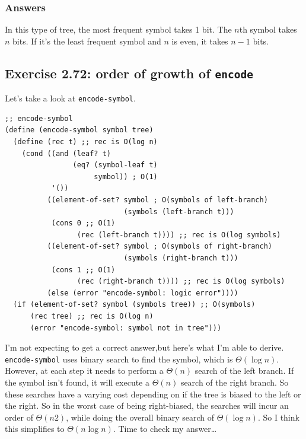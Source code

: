 \documentclass[final,fleqn,titlepage,twoside]{article}
\begin{document}
\subsubsection{Answers}
\label{sec:orgdb2de23}
In this type of tree, the most frequent symbol takes 1 bit. The \(n\)th symbol
takes \(n\) bits. If it's the least frequent symbol and \(n\) is even, it takes
\(n-1\) bits.

\subsection{Exercise 2.72: order of growth of \texttt{encode}}
\label{sec:org1d4944f}
Let's take a look at \texttt{encode-symbol}. 

\begin{verbatim}
;; encode-symbol
(define (encode-symbol symbol tree)
  (define (rec t) ;; rec is O(log n)
    (cond ((and (leaf? t) 
                (eq? (symbol-leaf t)
                     symbol)) ; O(1)
           '())
          ((element-of-set? symbol ; O(symbols of left-branch)
                            (symbols (left-branch t)))
           (cons 0 ;; O(1)
                 (rec (left-branch t)))) ;; rec is O(log symbols)
          ((element-of-set? symbol ; O(symbols of right-branch)
                            (symbols (right-branch t)))
           (cons 1 ;; O(1)
                 (rec (right-branch t)))) ;; rec is O(log symbols)
          (else (error "encode-symbol: logic error"))))
  (if (element-of-set? symbol (symbols tree)) ;; O(symbols)
      (rec tree) ;; rec is O(log n)
      (error "encode-symbol: symbol not in tree")))
\end{verbatim}

I'm not expecting to get a correct answer,but here's what I'm able to derive.
\texttt{encode-symbol} uses binary search to find the symbol, which is
\(\Theta(\log{n})\). However, at each step it needs to perform a \(\Theta(n)\)
search of the left branch. If the symbol isn't found, it will execute a
\(\Theta(n)\) search of the right branch. So these searches have a varying cost
depending on if the tree is biased to the left or the right. So in the worst
case of being right-biased, the searches will incur an order of \(\Theta(n2)\),
while doing the overall binary search of \(\Theta(\log{n})\). So I think this
simplifies to \(\Theta(n \log{n})\). Time to check my answer\ldots{}
\end{document}

